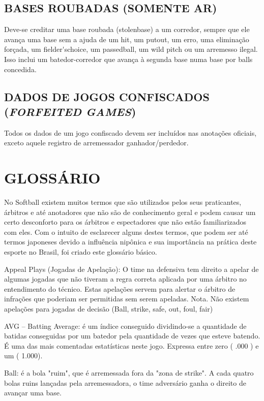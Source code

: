 	\section{BASES ROUBADAS (SOMENTE AR)}

			Deve-se creditar uma base roubada (\gls{stolenbase}) a um corredor, sempre que ele avança uma base sem a ajuda de um \gls{hit}, um \gls{putout}, um erro, uma eliminação forçada, um \gls{fielder'schoice}, um \gls{passedball}, um \gls{wild pitch} ou um arremesso ilegal. Isso inclui um batedor-corredor que avança à segunda base numa base por \glspl{ball} concedida.

	\section{DADOS DE JOGOS CONFISCADOS (\textit{FORFEITED GAMES})}

 	Todos os dados de um jogo confiscado devem ser incluídos nas anotações oficiais, exceto aquele registro de arremessador ganhador/perdedor.

\chapter*{GLOSSÁRIO}

No Softball existem muitos termos que são utilizados pelos seus praticantes, árbitros e até anotadores que não são de conhecimento geral e podem causar um certo desconforto para os árbitros e espectadores que não estão familiarizados com eles. Com o intuito de esclarecer alguns destes termos, que podem ser até termos japoneses devido a influência nipônica e sua importância na prática deste esporte no Brasil, foi criado este glossário básico.



Appeal Plays (Jogadas de Apelação): O time na defensiva tem direito a apelar de algumas jogadas que não tiveram a regra correta aplicada por uma árbitro no entendimento do técnico. Estas apelações servem para alertar o árbitro de infrações que poderiam ser permitidas sem serem apeladas. Nota. Não existem apelações para jogadas de decisão (Ball, strike, safe, out, foul, fair)

 AVG -- Batting Average: é um índice conseguido dividindo-se a quantidade de batidas conseguidas por um batedor pela quantidade de vezes que esteve batendo. É uma das mais comentadas estatísticas neste jogo. Expressa entre zero ( .000 ) e um ( 1.000).

 Ball: é a bola "ruim", que é arremessada fora da "zona de strike". A cada quatro bolas ruins lançadas pela arremessadora, o time adversário ganha o direito de avançar uma base.

